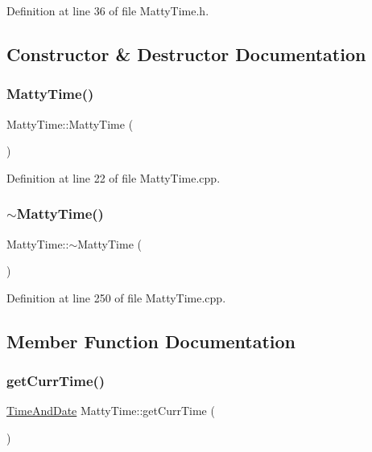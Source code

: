 Definition at line 36 of file Matty\+Time.\+h.



\subsection{Constructor \& Destructor Documentation}
\hypertarget{classMattyTime_aebf245aa0b578982cad3f679ea5348cd}{}\label{classMattyTime_aebf245aa0b578982cad3f679ea5348cd} 
\subsubsection{\texorpdfstring{Matty\+Time()}{MattyTime()}}
{\footnotesize\ttfamily Matty\+Time\+::\+Matty\+Time (\begin{DoxyParamCaption}{ }\end{DoxyParamCaption})}



Definition at line 22 of file Matty\+Time.\+cpp.

\hypertarget{classMattyTime_acb302c8f6c5215dc974f87753ed2fd61}{}\label{classMattyTime_acb302c8f6c5215dc974f87753ed2fd61} 
\subsubsection{\texorpdfstring{$\sim$\+Matty\+Time()}{~MattyTime()}}
{\footnotesize\ttfamily Matty\+Time\+::$\sim$\+Matty\+Time (\begin{DoxyParamCaption}{ }\end{DoxyParamCaption})}



Definition at line 250 of file Matty\+Time.\+cpp.



\subsection{Member Function Documentation}
\hypertarget{classMattyTime_a64fff9c9a7da58881a4c0cc1a2ac84f7}{}\label{classMattyTime_a64fff9c9a7da58881a4c0cc1a2ac84f7} 
\subsubsection{\texorpdfstring{get\+Curr\+Time()}{getCurrTime()}}
{\footnotesize\ttfamily \hyperlink{structTimeAndDate}{Time\+And\+Date} Matty\+Time\+::get\+Curr\+Time (\begin{DoxyParamCaption}{ }\end{DoxyParamCaption})\hspace{0.3cm}{\ttfamily [static]}}



